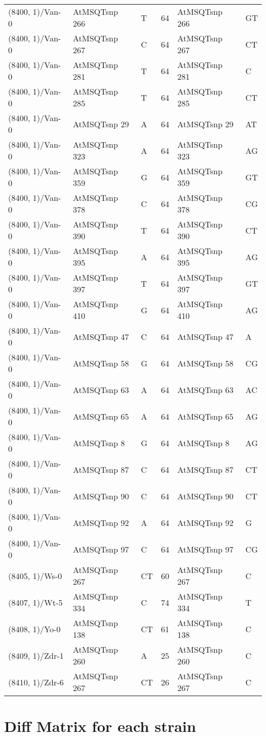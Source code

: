 \begin{center}
\begin{longtable}{|l|l|l|l|l|l|}
(8400, 1)/Van-0&AtMSQTsnp 266&T&64&AtMSQTsnp 266&GT\\
(8400, 1)/Van-0&AtMSQTsnp 267&C&64&AtMSQTsnp 267&CT\\
(8400, 1)/Van-0&AtMSQTsnp 281&T&64&AtMSQTsnp 281&C\\
(8400, 1)/Van-0&AtMSQTsnp 285&T&64&AtMSQTsnp 285&CT\\
(8400, 1)/Van-0&AtMSQTsnp 29&A&64&AtMSQTsnp 29&AT\\
(8400, 1)/Van-0&AtMSQTsnp 323&A&64&AtMSQTsnp 323&AG\\
(8400, 1)/Van-0&AtMSQTsnp 359&G&64&AtMSQTsnp 359&GT\\
(8400, 1)/Van-0&AtMSQTsnp 378&C&64&AtMSQTsnp 378&CG\\
(8400, 1)/Van-0&AtMSQTsnp 390&T&64&AtMSQTsnp 390&CT\\
(8400, 1)/Van-0&AtMSQTsnp 395&A&64&AtMSQTsnp 395&AG\\
(8400, 1)/Van-0&AtMSQTsnp 397&T&64&AtMSQTsnp 397&GT\\
(8400, 1)/Van-0&AtMSQTsnp 410&G&64&AtMSQTsnp 410&AG\\
(8400, 1)/Van-0&AtMSQTsnp 47&C&64&AtMSQTsnp 47&A\\
(8400, 1)/Van-0&AtMSQTsnp 58&G&64&AtMSQTsnp 58&CG\\
(8400, 1)/Van-0&AtMSQTsnp 63&A&64&AtMSQTsnp 63&AC\\
(8400, 1)/Van-0&AtMSQTsnp 65&A&64&AtMSQTsnp 65&AG\\
(8400, 1)/Van-0&AtMSQTsnp 8&G&64&AtMSQTsnp 8&AG\\
(8400, 1)/Van-0&AtMSQTsnp 87&C&64&AtMSQTsnp 87&CT\\
(8400, 1)/Van-0&AtMSQTsnp 90&C&64&AtMSQTsnp 90&CT\\
(8400, 1)/Van-0&AtMSQTsnp 92&A&64&AtMSQTsnp 92&G\\
(8400, 1)/Van-0&AtMSQTsnp 97&C&64&AtMSQTsnp 97&CG\\
(8405, 1)/Ws-0&AtMSQTsnp 267&CT&60&AtMSQTsnp 267&C\\
(8407, 1)/Wt-5&AtMSQTsnp 334&C&74&AtMSQTsnp 334&T\\
(8408, 1)/Yo-0&AtMSQTsnp 138&CT&61&AtMSQTsnp 138&C\\
(8409, 1)/Zdr-1&AtMSQTsnp 260&A&25&AtMSQTsnp 260&C\\
(8410, 1)/Zdr-6&AtMSQTsnp 267&CT&26&AtMSQTsnp 267&C\\
\hline
\end{longtable}
\end{center}

\section{Diff Matrix for each strain} \label{section_strain_wise}
